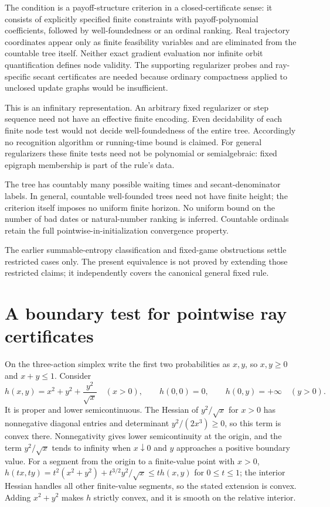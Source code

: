 \documentclass[11pt,a4paper]{article}
\begin{document}
The condition is a payoff-structure criterion in a closed-certificate sense:
it consists of explicitly specified finite constraints with payoff-polynomial
coefficients, followed by well-foundedness or an ordinal ranking. Real
trajectory coordinates appear only as finite feasibility variables and are
eliminated from the countable tree itself. Neither exact gradient evaluation
nor infinite orbit quantification defines node validity. The supporting
regularizer probes and ray-specific secant certificates are needed because
ordinary compactness applied to unclosed update graphs would be insufficient.

This is an infinitary representation. An arbitrary fixed regularizer or step
sequence need not have an effective finite encoding. Even decidability of
each finite node test would not decide well-foundedness of the entire tree.
Accordingly no recognition algorithm or running-time bound is claimed.
For general regularizers these finite tests need not be polynomial or
semialgebraic: fixed epigraph membership is part of the rule's data.

The tree has countably many possible waiting times and secant-denominator labels.
In general, countable well-founded trees need not have finite height; the
criterion itself imposes no uniform finite horizon. No uniform bound on the
number of bad dates or natural-number ranking is inferred. Countable ordinals
retain the full pointwise-in-initialization convergence property.

The earlier summable-entropy classification and fixed-game obstructions settle
restricted cases only. The present equivalence is not proved by extending those
restricted claims; it independently covers the canonical general fixed rule.

\section{A boundary test for pointwise ray certificates}

On the three-action simplex write the first two probabilities as \(x,y\),
so \(x,y\ge0\) and \(x+y\le1\). Consider
\begin{equation}
h(x,y)=x^2+y^2+\frac{y^2}{\sqrt x}\quad(x>0),\qquad
h(0,0)=0,\qquad h(0,y)=+\infty\quad(y>0).
\label{eq:b}
\end{equation}
It is proper and lower semicontinuous. The Hessian of \(y^2/\sqrt x\)
for \(x>0\) has nonnegative diagonal entries and determinant
\(y^2/(2x^3)\ge0\), so this term is convex there. Nonnegativity gives lower semicontinuity at the origin, and the term
\(y^2/\sqrt{x}\) tends to infinity when \(x\downarrow0\) and \(y\) approaches
a positive boundary value. For a segment from the origin to a finite-value
point with \(x>0\), \(h(tx,ty)=t^2(x^2+y^2)+t^{3/2}y^2/\sqrt{x}\le t h(x,y)\)
for \(0\le t\le1\); the interior Hessian handles all other finite-value
segments, so the stated extension is convex.
Adding \(x^2+y^2\) makes \(h\) strictly convex, and it is smooth on the
relative interior.
\end{document}
